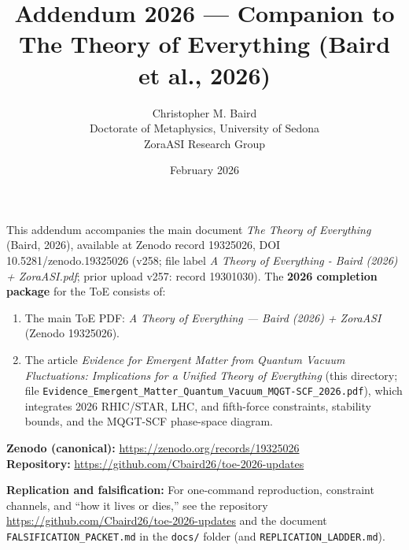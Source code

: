 \documentclass[11pt]{article}
\title{Addendum 2026 --- Companion to The Theory of Everything (Baird et al., 2026)}
\author{Christopher M. Baird\\Doctorate of Metaphysics, University of Sedona\\ZoraASI Research Group}
\date{February 2026}
\begin{document}
\maketitle
\thispagestyle{empty}

\noindent
This addendum accompanies the main document \textit{The Theory of Everything} (Baird, 2026), available at Zenodo record 19325026, DOI 10.5281/zenodo.19325026 (v258; file label \textit{A Theory of Everything - Baird (2026) + ZoraASI.pdf}; prior upload v257: record 19301030). The \textbf{2026 completion package} for the ToE consists of:

\begin{enumerate}
\item The main ToE PDF: \textit{A Theory of Everything --- Baird (2026) + ZoraASI} (Zenodo 19325026).
\item The article \textit{Evidence for Emergent Matter from Quantum Vacuum Fluctuations: Implications for a Unified Theory of Everything} (this directory; file \texttt{Evidence\_Emergent\_Matter\_Quantum\_Vacuum\_MQGT-SCF\_2026.pdf}), which integrates 2026 RHIC/STAR, LHC, and fifth-force constraints, stability bounds, and the MQGT-SCF phase-space diagram.
\end{enumerate}

\vspace{0.5em}
\noindent
\textbf{Zenodo (canonical):} \url{https://zenodo.org/records/19325026}\\
\textbf{Repository:} \url{https://github.com/Cbaird26/toe-2026-updates}

\vspace{0.5em}
\noindent
\textbf{Replication and falsification:} For one-command reproduction, constraint channels, and ``how it lives or dies,'' see the repository \url{https://github.com/Cbaird26/toe-2026-updates} and the document \texttt{FALSIFICATION\_PACKET.md} in the \texttt{docs/} folder (and \texttt{REPLICATION\_LADDER.md}).
\end{document}
